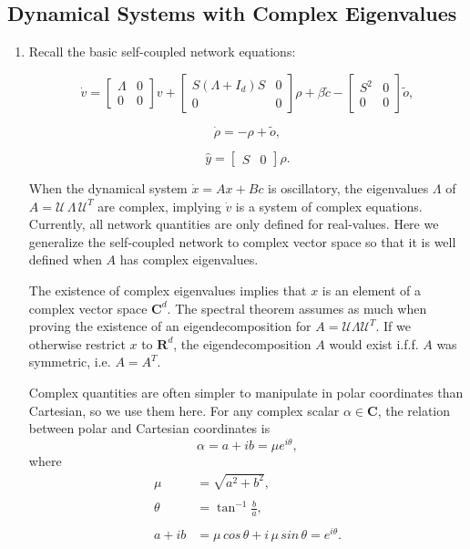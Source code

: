 \subsection{Dynamical Systems with Complex Eigenvalues}
\begin{enumerate}


\item Recall the basic self-coupled network equations:

$$
\dot{v}
= 
\begin{bmatrix}
\Lambda & 0
\\
0 & 0
\end{bmatrix}
v +
\begin{bmatrix}
S \left(\Lambda + I_d \right) S & 0
\\
0 & 0
\end{bmatrix}
  \rho 
+ \beta \tilde{c}  
  - 
 \begin{bmatrix}
S^2 & 0
\\
0 & 0
\end{bmatrix}
    \tilde{o},
$$

$$
\dot{\rho} = -\rho + \tilde{o},
$$

$$
\hat{y} = \begin{bmatrix}
S & 0
\end{bmatrix}
\rho.
$$

When the dynamical system $\dot{x} = Ax + Bc$ is oscillatory, the eigenvalues $\Lambda$ of $A=\mathcal{U} \, \Lambda \, \mathcal{U}^T$ are complex, implying $\dot{v}$ is a system of complex equations. Currently, all network quantities are only defined for real-values. Here we generalize the self-coupled network to complex vector space so that it is well defined when $A$ has complex eigenvalues.

The existence of complex eigenvalues implies that $x$ is an element of a complex vector space $\mathbf{C}^d$. The spectral theorem assumes as much when proving the existence of an eigendecomposition for $A = \mathcal{U} \Lambda \mathcal{U}^T$. If we otherwise restrict $x$ to $\mathbf{R}^d$, the eigendecomposition $A$ would exist i.f.f. $A$ was symmetric, i.e. $A = A^T$. 

Complex quantities are often simpler to manipulate in polar coordinates than Cartesian, so we use them here. For any complex scalar $\alpha \in \mathbf{C}$, the relation between polar and Cartesian coordinates is
$$
\alpha = a + i b = \mu e^{i \theta}, 
$$
where
\begin{align*}
\mu &= \sqrt{a^2 + b^2}, 
\\
\\
\theta &= \tan^{-1}\frac{b}{a},
\\
\\
a + ib &= \mu \, cos \,\theta + i \, \mu \,  sin \, \theta = e^{i\theta}.
\end{align*}


\end{enumerate}
